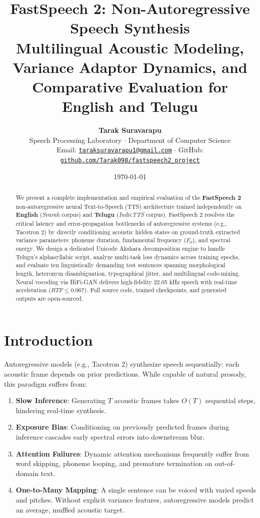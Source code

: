\documentclass[10pt,twocolumn,a4paper]{article}
\title{\textbf{\Large FastSpeech 2: Non-Autoregressive Speech Synthesis}\\[0.2cm]
\large Multilingual Acoustic Modeling, Variance Adaptor Dynamics, and\\Comparative Evaluation for English and Telugu}
\author{\textbf{Tarak Suravarapu} \\
Speech Processing Laboratory $\cdot$ Department of Computer Science \\
Email: \href{mailto:taraksuravarapu1@gmail.com}{\texttt{taraksuravarapu1@gmail.com}} $\cdot$ GitHub: \href{https://github.com/Tarak098/fastspeech2_project}{\texttt{github.com/Tarak098/fastspeech2\_project}}}
\date{\today}
\begin{document}
\maketitle

\begin{abstract}
We present a complete implementation and empirical evaluation of the \textbf{FastSpeech 2} non-autoregressive neural Text-to-Speech (TTS) architecture trained independently on \textbf{English} (\textit{Svarah} corpus) and \textbf{Telugu} (\textit{IndicTTS} corpus). FastSpeech 2 resolves the critical latency and error-propagation bottlenecks of autoregressive systems (e.g., Tacotron 2) by directly conditioning acoustic hidden states on ground-truth extracted variance parameters: phoneme duration, fundamental frequency ($F_0$), and spectral energy. We design a dedicated Unicode Akshara decomposition engine to handle Telugu's alphasyllabic script, analyze multi-task loss dynamics across training epochs, and evaluate ten linguistically demanding test sentences spanning morphological length, heteronym disambiguation, typographical jitter, and multilingual code-mixing. Neural vocoding via HiFi-GAN delivers high-fidelity 22.05 kHz speech with real-time acceleration ($RTF \le 0.067$). Full source code, trained checkpoints, and generated outputs are open-sourced.
\end{abstract}

\section{Introduction}

Autoregressive models (e.g., Tacotron 2) synthesize speech sequentially: each acoustic frame depends on prior predictions. While capable of natural prosody, this paradigm suffers from:
\begin{enumerate}[noitemsep]
    \item \textbf{Slow Inference}: Generating $T$ acoustic frames takes $O(T)$ sequential steps, hindering real-time synthesis.
    \item \textbf{Exposure Bias}: Conditioning on previously predicted frames during inference cascades early spectral errors into downstream blur.
    \item \textbf{Attention Failures}: Dynamic attention mechanisms frequently suffer from word skipping, phoneme looping, and premature termination on out-of-domain text.
    \item \textbf{One-to-Many Mapping}: A single sentence can be voiced with varied speeds and pitches. Without explicit variance features, autoregressive models predict an average, muffled acoustic target.
\end{enumerate}
\end{document}
